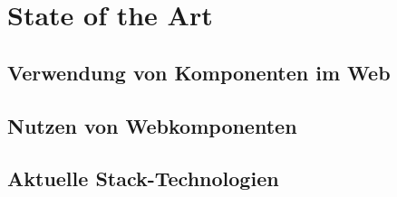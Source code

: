 \chapter{State of the Art}

\section{Verwendung von Komponenten im Web}

\section{Nutzen von Webkomponenten}

\section{Aktuelle Stack-Technologien}